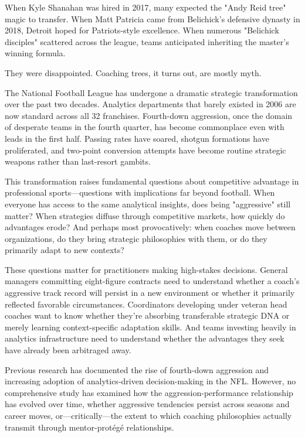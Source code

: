 \documentclass[11pt,twocolumn]{article}
\begin{document}
When Kyle Shanahan was hired in 2017, many expected the "Andy Reid tree" magic to transfer. When Matt Patricia came from Belichick's defensive dynasty in 2018, Detroit hoped for Patriots-style excellence. When numerous "Belichick disciples" scattered across the league, teams anticipated inheriting the master's winning formula.

They were disappointed. Coaching trees, it turns out, are mostly myth.

The National Football League has undergone a dramatic strategic transformation over the past two decades. Analytics departments that barely existed in 2006 are now standard across all 32 franchises. Fourth-down aggression, once the domain of desperate teams in the fourth quarter, has become commonplace even with leads in the first half. Passing rates have soared, shotgun formations have proliferated, and two-point conversion attempts have become routine strategic weapons rather than last-resort gambits.

This transformation raises fundamental questions about competitive advantage in professional sports---questions with implications far beyond football. When everyone has access to the same analytical insights, does being "aggressive" still matter? When strategies diffuse through competitive markets, how quickly do advantages erode? And perhaps most provocatively: when coaches move between organizations, do they bring strategic philosophies with them, or do they primarily adapt to new contexts?

These questions matter for practitioners making high-stakes decisions. General managers committing eight-figure contracts need to understand whether a coach's aggressive track record will persist in a new environment or whether it primarily reflected favorable circumstances. Coordinators developing under veteran head coaches want to know whether they're absorbing transferable strategic DNA or merely learning context-specific adaptation skills. And teams investing heavily in analytics infrastructure need to understand whether the advantages they seek have already been arbitraged away.

Previous research has documented the rise of fourth-down aggression and increasing adoption of analytics-driven decision-making in the NFL. However, no comprehensive study has examined how the aggression-performance relationship has evolved over time, whether aggressive tendencies persist across seasons and career moves, or---critically---the extent to which coaching philosophies actually transmit through mentor-protégé relationships.
\end{document}
